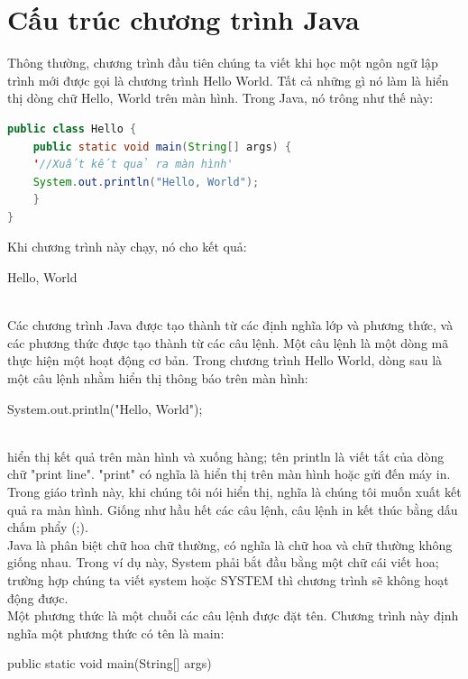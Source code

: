 \section{Cấu trúc chương trình Java}
\indent Thông thường, chương trình đầu tiên chúng ta viết khi học một ngôn ngữ lập trình mới được gọi là chương trình {\ttfamily Hello World}. Tất cả những gì nó làm là hiển thị dòng chữ {\ttfamily Hello, World} trên màn hình. Trong Java, nó trông như thế này:
\begin{lstlisting}[escapechar=',language=java]	
public class Hello {
	public static void main(String[] args) {
	'//Xuất kết quả ra màn hình'
	System.out.println("Hello, World");
	}
}
 \end{lstlisting}

\indent Khi chương trình này chạy, nó cho kết quả:\\
\centerline {\ttfamily Hello, World} \\
\indent Các chương trình Java được tạo thành từ các định nghĩa lớp và phương thức, và các phương thức được tạo thành từ các câu lệnh. Một câu lệnh là một dòng mã thực hiện một hoạt động cơ bản. Trong chương trình {\ttfamily Hello World}, dòng sau là một câu lệnh nhằm hiển thị thông báo trên màn hình: \\
\centerline {\ttfamily System.out.println("Hello, World");}\\
 hiển thị kết quả trên màn hình và xuống hàng; tên {\ttfamily println} là viết tắt của dòng chữ {\ttfamily "print line"}. {\ttfamily "print"} có nghĩa là hiển thị trên màn hình hoặc gửi đến máy in. Trong giáo trình này, khi chúng tôi nói hiển thị, nghĩa là chúng tôi muốn xuất kết quả ra màn hình. Giống như hầu hết các câu lệnh, câu lệnh in kết thúc bằng dấu chấm phẩy (;).\\
\indent Java là phân biệt chữ hoa chữ thường, có nghĩa là chữ hoa và chữ thường không giống nhau. Trong ví dụ này, {\ttfamily System} phải bắt đầu bằng một chữ cái viết hoa; trường hợp chúng ta viết {\ttfamily system} hoặc {\ttfamily SYSTEM} thì chương trình sẽ không hoạt động được.\\
\indent Một phương thức là một chuỗi các câu lệnh được đặt tên. Chương trình này định nghĩa một phương thức có tên là main: \\
\centerline{\ttfamily  public static void main(String[] args)}

